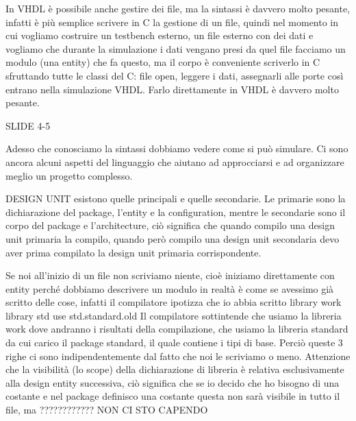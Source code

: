 \documentclass[10pt,a4paper,titlepage]{article}
\begin{document}
In VHDL è possibile anche gestire dei file, ma la sintassi è davvero molto pesante, infatti è più semplice scrivere in C la gestione di un file, quindi nel momento in cui vogliamo costruire un testbench esterno, un file esterno con dei dati e vogliamo che durante la simulazione i dati vengano presi da quel file facciamo un modulo (una entity) che fa questo, ma il corpo è conveniente scriverlo in C sfruttando tutte le classi del C: file open, leggere i dati, assegnarli alle porte così entrano nella simulazione VHDL. Farlo direttamente in VHDL è davvero molto pesante.

SLIDE 4-5

Adesso che conosciamo la sintassi dobbiamo vedere come si può simulare. Ci sono ancora alcuni aspetti del linguaggio che aiutano ad approcciarsi e ad organizzare meglio un progetto complesso.

DESIGN UNIT esistono quelle principali e quelle secondarie. Le primarie sono la dichiarazione del package, l’entity e la configuration, mentre le secondarie sono il corpo del package e l’architecture, ciò significa che quando compilo una design unit primaria la compilo, quando però compilo una design unit secondaria devo aver prima compilato la design unit primaria corrispondente.


Se noi all’inizio di un file non scriviamo niente, cioè iniziamo direttamente con entity perché dobbiamo descrivere un modulo in realtà è come se avessimo già scritto delle cose, infatti il compilatore ipotizza che io abbia scritto 
library work
library std
use std.standard.old
Il compilatore sottintende che usiamo la libreria work dove andranno i risultati della compilazione, che usiamo la libreria standard da cui carico il package standard, il quale contiene i tipi di base. Perciò queste 3 righe ci sono indipendentemente dal fatto che noi le scriviamo o meno.
Attenzione che la visibilità (lo scope) della dichiarazione di libreria è relativa esclusivamente alla design entity successiva, ciò significa che se io decido che ho bisogno di una costante e nel package definisco una costante questa non sarà visibile in tutto il file, ma  ???????????? NON CI STO CAPENDO 
\end{document}
